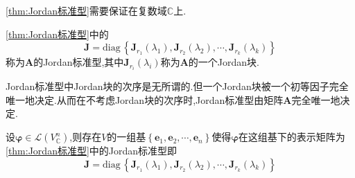 \begin{red}
    \begin{remark}
        \cref{thm:Jordan标准型}需要保证在复数域$\mathbb{C}$上.
    \end{remark}
\end{red}
\begin{formal}
\begin{definition}[Jordan标准型]\label{def:Jordan标准型}
    \cref{thm:Jordan标准型}中的\[
    \bm{J}= \mathrm{diag}\,\left\{
        \bm{J}_{r_1}\left(\lambda_1\right),\bm{J}_{r_2}\left(\lambda_2\right),\cdots,\bm{J}_{r_k}\left(\lambda_k\right)
    \right\}
    \]称为$\bm{A}$的\textup{Jordan}标准型,其中$\bm{J}_{r_i}\left(\lambda_i\right)$称为$\bm{A}$的一个\textup{Jordan}块.
\end{definition}
\end{formal}
\begin{red}
\begin{remark}
    \textup{Jordan}标准型中\textup{Jordan}块的次序是无所谓的.但一个\textup{Jordan}块被一个初等因子完全唯一地决定.从而在不考虑\textup{Jordan}块的次序时,\textup{Jordan}标准型由矩阵$\bm{A}$完全唯一地决定.
\end{remark}
\end{red}
\begin{formal}
\begin{theorem}[几何意义的Jordan标准型]\label{thm:几何意义的Jordan标准型}
    设$\bm{\varphi}\in \mathcal{L}\left(
        V_{\mathbb{C}}^n
    \right)$,则存在$V$的一组基$\left\{
        \bm{e}_1,\bm{e}_2,\cdots,\bm{e}_n
    \right\}$使得$\bm{\varphi}$在这组基下的表示矩阵为\cref{thm:Jordan标准型}中的\textup{Jordan}标准型即\[
    \bm{J}= \mathrm{diag}\,\left\{
        \bm{J}_{r_1}\left(\lambda_1\right),\bm{J}_{r_2}\left(\lambda_2\right),\cdots,\bm{J}_{r_k}\left(\lambda_k\right)
    \right\}
    \]
\end{theorem}
\end{formal}
